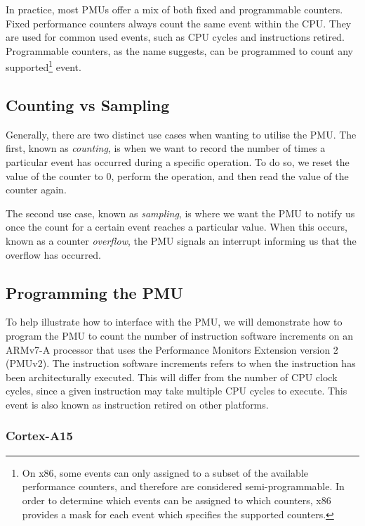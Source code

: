 {In practice, most PMUs offer a mix of both fixed and programmable counters. Fixed performance counters always count the same event within the CPU. They are used for common used events, such as CPU cycles and instructions retired. Programmable counters, as the name suggests, can be programmed to count any supported\footnote{On x86, some events can only assigned to a subset of the available performance counters, and therefore are considered semi-programmable. In order to determine which events can be assigned to which counters, x86 provides a mask for each event which specifies the supported counters.} event.

\subsection{Counting vs Sampling}\label{sect:sampling_counting}

Generally, there are two distinct use cases when wanting to utilise the PMU. The first, known as \textit{counting}, is when we want to record the number of times a particular event has occurred during a specific operation. To do so, we reset the value of the counter to 0, perform the operation, and then read the value of the counter again. 

The second use case, known as \textit{sampling}, is where we want the PMU to notify us once the count for a certain event reaches a particular value. When this occurs, known as a counter \textit{overflow}, the PMU signals an interrupt informing us that the overflow has occurred. 

\subsection{Programming the PMU}\label{sect:programming_pmu}

To help illustrate how to interface with the PMU, we will demonstrate how to program the PMU to count the number of instruction software increments on an ARMv7-A processor that uses the Performance Monitors Extension version 2 (PMUv2). The instruction software increments refers to when the instruction has been architecturally executed. This will differ from the number of CPU clock cycles, since a given instruction may take multiple CPU cycles to execute. This event is also known as instruction retired on other platforms.

\subsubsection{Cortex-A15}

}
